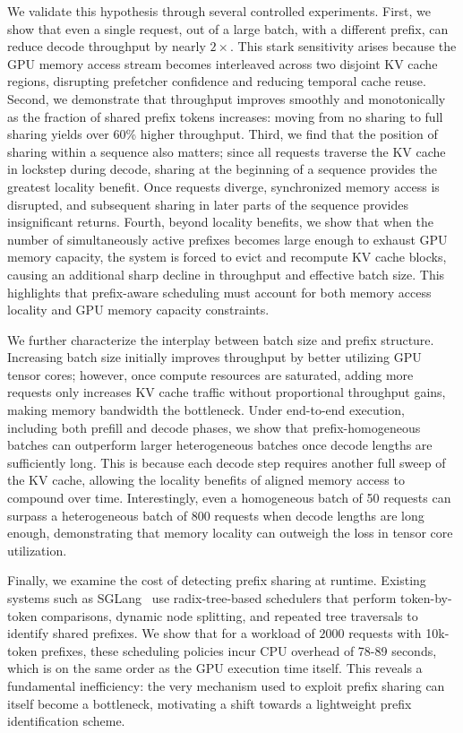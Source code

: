 We validate this hypothesis through several controlled experiments. First, we show that even a single request, out of a large batch, with a different prefix, can reduce decode throughput by nearly $2\times$. This stark sensitivity arises because the GPU memory access stream becomes interleaved across two disjoint KV cache regions, disrupting prefetcher confidence and reducing temporal cache reuse. Second, we demonstrate that throughput improves smoothly and monotonically as the fraction of shared prefix tokens increases: moving from no sharing to full sharing yields over 60\% higher throughput. Third, we find that the position of sharing within a sequence also matters; since all requests traverse the KV cache in lockstep during decode, sharing at the beginning of a sequence provides the greatest locality benefit. Once requests diverge, synchronized memory access is disrupted, and subsequent sharing in later parts of the sequence provides insignificant returns. Fourth, beyond locality benefits, we show that when the number of simultaneously active prefixes becomes large enough to exhaust GPU memory capacity, the system is forced to evict and recompute KV cache blocks, causing an additional sharp decline in throughput and effective batch size. This highlights that prefix-aware scheduling must account for both memory access locality and GPU memory capacity constraints.

We further characterize the interplay between batch size and prefix structure. Increasing batch size initially improves throughput by better utilizing GPU tensor cores; however, once compute resources are saturated, adding more requests only increases KV cache traffic without proportional throughput gains, making memory bandwidth the bottleneck. Under end-to-end execution, including both prefill and decode phases, we show that prefix-homogeneous batches can outperform larger heterogeneous batches once decode lengths are sufficiently long. This is because each decode step requires another full sweep of the KV cache, allowing the locality benefits of aligned memory access to compound over time. Interestingly, even a homogeneous batch of 50 requests can surpass a heterogeneous batch of 800 requests when decode lengths are long enough, demonstrating that memory locality can outweigh the loss in tensor core utilization.

Finally, we examine the cost of detecting prefix sharing at runtime. Existing systems such as SGLang~\cite{zheng2024sglangefficientexecutionstructured} use radix-tree-based schedulers that perform token-by-token comparisons, dynamic node splitting, and repeated tree traversals to identify shared prefixes. We show that for a workload of $2000$ requests with 10k-token prefixes, these scheduling policies incur CPU overhead of 78-89 seconds, which is on the same order as the GPU execution time itself. This reveals a fundamental inefficiency: the very mechanism used to exploit prefix sharing can itself become a bottleneck, motivating a shift towards a lightweight prefix identification scheme.

